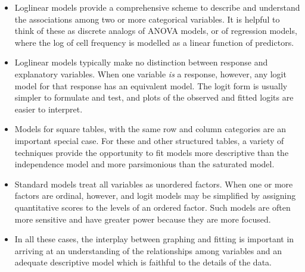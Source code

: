 \begin{itemize}
\item Loglinear models provide a comprehensive scheme to describe and
understand the associations among two or more categorical variables.
It is helpful to think of these as discrete analogs of ANOVA models,
or of regression models, where the log of cell frequency is modelled
as a linear function of predictors.


\item Loglinear models typically make no distinction between response
and explanatory variables.
When one variable \emph{is} a response, however, any logit model for
that response has an equivalent \loglin model.
The logit form is usually simpler to formulate and test, and plots of
the observed and fitted logits are easier to interpret.

\item Models for square tables, with the same row and column categories
are an important special case. For these and other structured tables,
a variety of techniques provide the opportunity to fit models more
descriptive than the independence model and more parsimonious than
the saturated model.

\item Standard \loglin models treat all variables as unordered factors.
When one or more factors are ordinal, however, \loglin and logit models
may be simplified by assigning quantitative scores to the levels of
an ordered factor.
Such models are often more sensitive and have greater power because they
are more focused.

\item In all these cases, the interplay between graphing and fitting is important in 
arriving at an understanding of the relationships among variables and
an adequate descriptive model which is faithful to the details of the
data.



\end{itemize}
